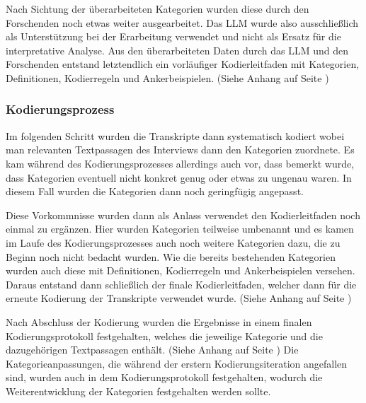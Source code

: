 Nach Sichtung der überarbeiteten Kategorien wurden diese durch den Forschenden noch etwas weiter ausgearbeitet. Das LLM wurde also ausschließlich als Unterstützung bei der Erarbeitung verwendet und nicht als Ersatz für die interpretative Analyse. Aus den überarbeiteten Daten durch das LLM und den Forschenden entstand letztendlich ein vorläufiger Kodierleitfaden mit Kategorien, Definitionen, Kodierregeln und Ankerbeispielen. (Siehe Anhang auf Seite \pageref{app:kategorien3})

\subsubsection{Kodierungsprozess}
Im folgenden Schritt wurden die Transkripte dann systematisch kodiert wobei man relevanten Textpassagen des Interviews dann den Kategorien zuordnete. Es kam während des Kodierungsprozesses allerdings auch vor, dass bemerkt wurde, dass Kategorien eventuell nicht konkret genug oder etwas zu ungenau waren. In diesem Fall wurden die Kategorien dann noch geringfügig angepasst.

Diese Vorkommnisse wurden dann als Anlass verwendet den Kodierleitfaden noch einmal zu ergänzen. Hier wurden Kategorien teilweise umbenannt und es kamen im Laufe des Kodierungsprozesses auch noch weitere Kategorien dazu, die zu Beginn noch nicht bedacht wurden. Wie die bereits bestehenden Kategorien wurden auch diese mit Definitionen, Kodierregeln und Ankerbeispielen versehen. Daraus entstand dann schließlich der finale Kodierleitfaden, welcher dann für die erneute Kodierung der Transkripte verwendet wurde. (Siehe Anhang auf Seite \pageref{app:kategorienfinal}) 

Nach Abschluss der Kodierung wurden die Ergebnisse in einem finalen Kodierungsprotokoll festgehalten, welches die jeweilige Kategorie und die dazugehörigen Textpassagen enthält. (Siehe Anhang auf Seite \pageref{app:kodierung}) Die Kategorieanpassungen, die während der erstern Kodierungsiteration angefallen sind, wurden auch in dem Kodierungsprotokoll festgehalten, wodurch die Weiterentwicklung der Kategorien festgehalten werden sollte.
